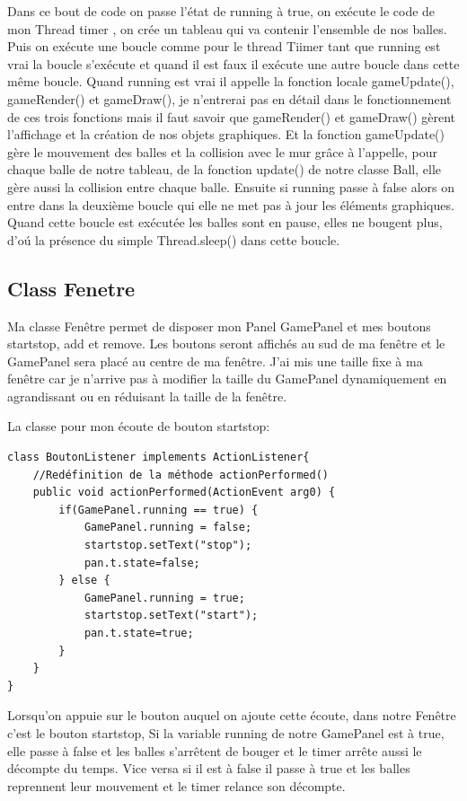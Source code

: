 \documentclass{article}
\begin{document}
Dans ce bout de code on passe l'état de running à true, on exécute le code de mon Thread timer , on crée un tableau qui va contenir l'ensemble de nos balles. Puis on exécute une boucle comme pour le thread Tiimer tant que running est vrai la boucle s'exécute et quand il est faux il exécute une autre boucle dans cette même boucle. \newline
Quand running est vrai il appelle la fonction locale gameUpdate(), gameRender() et gameDraw(), je n'entrerai pas en détail dans le fonctionnement de ces trois fonctions mais il faut savoir que gameRender() et gameDraw() gèrent l'affichage et la création de nos objets graphiques. Et la fonction gameUpdate() gère le mouvement des balles et la collision avec le mur grâce \`a l'appelle, pour chaque balle de notre tableau, de la fonction update() de notre classe Ball, elle gère aussi la collision entre chaque balle.\newline
Ensuite si running passe à false alors on entre dans la deuxième boucle qui elle ne met pas à jour les éléments graphiques. Quand cette boucle est exécutée les balles sont en pause, elles ne bougent plus, d'o\'u la présence du simple Thread.sleep() dans cette boucle.

\subsection{Class Fenetre}

Ma classe Fenêtre permet de disposer mon Panel GamePanel et mes boutons startstop, add et remove. Les boutons seront affichés au sud de ma fenêtre et le GamePanel sera placé au centre de ma fenêtre.
J'ai mis une taille fixe à ma fenêtre car je n'arrive pas à modifier la taille du GamePanel dynamiquement en agrandissant ou en réduisant la taille de la fenêtre.\vspace{5mm}

La classe pour mon écoute de bouton startstop:
\begin{verbatim}
class BoutonListener implements ActionListener{
    //Redéfinition de la méthode actionPerformed()
    public void actionPerformed(ActionEvent arg0) {
        if(GamePanel.running == true) {
            GamePanel.running = false;
            startstop.setText("stop");
            pan.t.state=false;
        } else {
            GamePanel.running = true;
            startstop.setText("start");
            pan.t.state=true;
        }
    }
}
\end{verbatim}

Lorsqu'on appuie sur le bouton auquel on ajoute cette écoute, dans notre Fenêtre c'est le bouton startstop, Si la variable running de notre GamePanel est à true, elle passe à false et les balles s'arrêtent de bouger et le timer arrête aussi le décompte du temps.\newline
Vice versa si il est à false il passe à true et les balles reprennent leur mouvement et le timer relance son décompte.\vspace{5mm}
\end{document}
